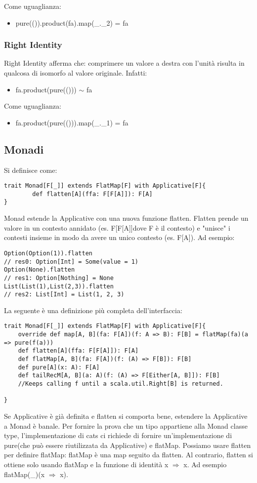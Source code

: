 \noindent Come uguaglianza:
\begin{itemize}
    \item pure(()).product(fa).map(\_.\_2) = fa
\end{itemize}

\subsubsection{Right Identity}
Right Identity afferma che: comprimere un valore a destra con l'unità risulta in qualcosa di isomorfo al valore originale.
Infatti:
\begin{itemize}
    \item fa.product(pure(())) $\sim$ fa
\end{itemize}
Come uguaglianza:
\begin{itemize}
    \item fa.product(pure(())).map(\_.\_1) = fa
\end{itemize}




\subsection{Monadi}
Si definisce come:
\begin{verbatim}
trait Monad[F[_]] extends FlatMap[F] with Applicative[F]{
        def flatten[A](ffa: F[F[A]]): F[A]
}
\end{verbatim}
\noindent Monad estende la Applicative con una nuova funzione flatten. Flatten prende un valore in un contesto annidato (es. F[F[A]]dove F è il contesto) e "unisce" i contesti insieme in modo da avere un unico contesto (es. F[A]).
Ad esempio:
\begin{verbatim}
Option(Option(1)).flatten
// res0: Option[Int] = Some(value = 1)
Option(None).flatten
// res1: Option[Nothing] = None
List(List(1),List(2,3)).flatten
// res2: List[Int] = List(1, 2, 3)    
\end{verbatim}
La seguente è una definizione più completa dell'interfaccia:
\begin{verbatim}
trait Monad[F[_]] extends FlatMap[F] with Applicative[F]{
    override def map[A, B](fa: F[A])(f: A => B): F[B] = flatMap(fa)(a => pure(f(a)))
    def flatten[A](ffa: F[F[A]]): F[A]
    def flatMap[A, B](fa: F[A])(f: (A) => F[B]): F[B]
    def pure[A](x: A): F[A]
    def tailRecM[A, B](a: A)(f: (A) => F[Either[A, B]]): F[B] 
    //Keeps calling f until a scala.util.Right[B] is returned.

}
\end{verbatim}
\noindent Se Applicative è già definita e flatten si comporta bene, estendere la Applicative a Monad è banale. Per fornire la prova che un tipo appartiene alla Monad classe type, l'implementazione di cats ci richiede di fornire un'implementazione di pure(che può essere riutilizzata da Applicative) e flatMap. Possiamo usare flatten per definire flatMap: flatMap è una map seguito da flatten. Al contrario, flatten si ottiene solo usando flatMap e la funzione di identità x $\Rightarrow$ x. Ad esempio flatMap(\_)(x $\Rightarrow$ x).

